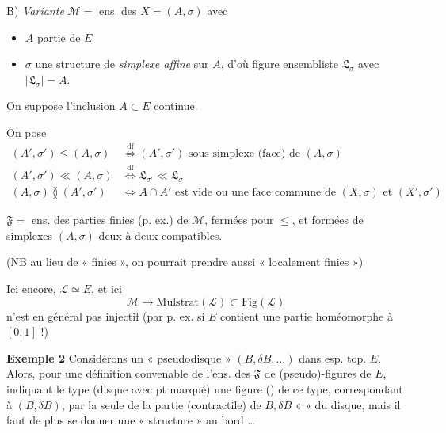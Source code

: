 \documentclass[11pt,a4paper]{article}
\begin{document}
B) \emph{Variante} $\mathcal{M} =$ ens. des   $X = (A, \sigma)$ avec
\begin{itemize}
  \item $A$ partie  de $E$
  \item $\sigma$ une structure de \emph{simplexe affine} sur $A$, d'où figure ensembliste $\mathfrak{L}_{\sigma}$ avec $|\mathfrak{L}_{\sigma}| = A$.
\end{itemize}
On suppose l'inclusion $A \subset E$ continue.

On pose
\[
  \begin{aligned}
    (A', \sigma') \leq (A, \sigma) &\overset{\mathrm{df}}{\Longleftrightarrow} (A', \sigma') \text{ sous-simplexe (face) de } (A, \sigma) \\
    (A', \sigma') \ll (A, \sigma) &\overset{\mathrm{df}}{\Longleftrightarrow} \mathfrak{L}_{\sigma'} \ll \mathfrak{L}_{\sigma} \\
    (A, \sigma) \between (A', \sigma') &\Longleftrightarrow A \cap A' \text{ est vide ou une face commune de } (X, \sigma) \text{ et } (X', \sigma')
  \end{aligned}
\]

$\mathfrak{F} =$ ens. des parties finies (p. ex.) de $\mathcal{M}$, fermées pour $\leq$, et formées de simplexes $(A, \sigma)$ deux à deux compatibles.

(NB au lieu de « finies », on pourrait prendre aussi « localement finies »)

Ici encore, $\mathcal{L} \simeq E$, et ici
\[
  \mathcal{M} \longrightarrow \mathrm{Mulstrat}(\mathcal{L}) \subset \mathrm{Fig}(\mathcal{L})
\]
n'est en général pas injectif (par p. ex. si $E$ contient une partie homéomorphe à $[0,1]$ !)

\textbf{Exemple 2} Considérons un « pseudodisque » $(B, \delta B, \ldots)$ dans esp. top. $E$.  Alors,  pour une définition convenable de l'ens. des $\mathfrak{F}$ de (pseudo)-figures de $E$, indiquant le type   (disque avec pt marqué) une figure (\ill{}) de ce type, correspondant à $(B, \delta B)$, \ill{} par la seule \ill{} de la partie (contractile) \ill{} de $B, \delta B$ \ill{} « \ill{} » du disque, mais il faut de plus se donner une « structure \ill{} » \ill{} au bord \ldots{}
\end{document}

